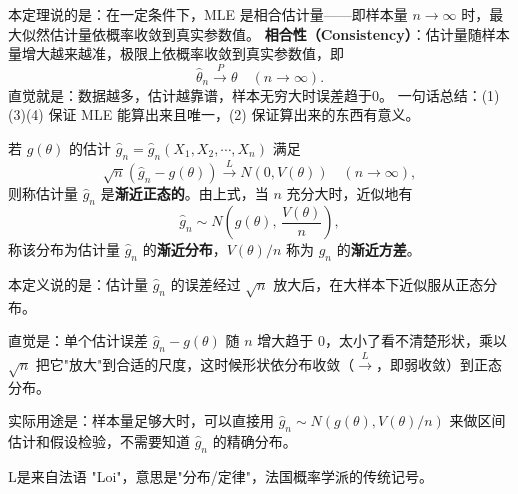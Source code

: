 \begin{note}
本定理说的是：在一定条件下，MLE 是相合估计量——即样本量 $n\to\infty$ 时，最大似然估计量依概率收敛到真实参数值。
\textbf{相合性（Consistency）}：估计量随样本量增大越来越准，极限上依概率收敛到真实参数值，即
$$
\hat{\theta}_n \xrightarrow{P} \theta \quad (n \to \infty).
$$
直觉就是：数据越多，估计越靠谱，样本无穷大时误差趋于0。
一句话总结：(1)(3)(4) 保证 MLE 能算出来且唯一，(2) 保证算出来的东西有意义。
\end{note}
\begin{definition}[渐近正态性]
若 $g(\theta)$ 的估计 $\hat{g}_n = \hat{g}_n(X_1,X_2,\cdots,X_n)$ 满足
$$
\sqrt{n}(\hat{g}_n - g(\theta)) \xrightarrow{L} N(0,V(\theta)) \quad (n\to\infty),
$$
则称估计量 $\hat{g}_n$ 是\textbf{渐近正态的}。由上式，当 $n$ 充分大时，近似地有
$$
\hat{g}_n \sim N\!\left(g(\theta),\, \frac{V(\theta)}{n}\right),
$$
称该分布为估计量 $\hat{g}_n$ 的\textbf{渐近分布}，$V(\theta)/n$ 称为 $\hat{g}_n$ 的\textbf{渐近方差}。
\end{definition}
\begin{note}
本定义说的是：估计量 $\hat{g}_n$ 的误差经过 $\sqrt{n}$ 放大后，在大样本下近似服从正态分布。

直觉是：单个估计误差 $\hat{g}_n - g(\theta)$ 随 $n$ 增大趋于 $0$，太小了看不清楚形状，乘以 $\sqrt{n}$ 把它"放大"到合适的尺度，这时候形状依分布收敛（$\xrightarrow{L}$，即弱收敛）到正态分布。

实际用途是：样本量足够大时，可以直接用 $\hat{g}_n \sim N(g(\theta), V(\theta)/n)$ 来做区间估计和假设检验，不需要知道 $\hat{g}_n$ 的精确分布。
\end{note}
L是来自法语 "Loi"，意思是"分布/定律"，法国概率学派的传统记号。
